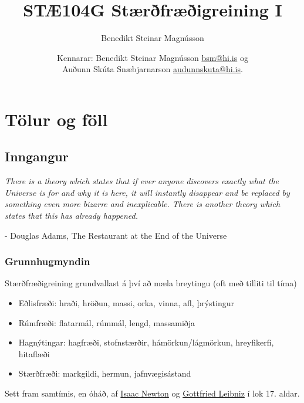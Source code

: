\documentclass[b5paper,10pt,icelandic]{sphinxmanual}
\title{STÆ104G Stærðfræðigreining I}
\date{Kennarar: Benedikt Steinar Magnússon \href{mailto:bsm@hi.is}{bsm@hi.is} og\\
	Auðunn Skúta Snæbjarnarson \href{mailto:audunnskuta@hi.is}{audunnskuta@hi.is}.}
\author{Benedikt Steinar Magnússon}
\begin{document}
\maketitle
\tableofcontents





\chapter{Tölur og föll}
\label{kafli01::doc}\label{kafli01:staerfraeigreining-i-stae104g-haskoli-islands-haust-2017}\label{kafli01:tolur-og-foll}

\section{Inngangur}
\label{kafli01:inngangur}
\emph{There is a theory which states that if ever anyone discovers exactly what the Universe is for and why it is here, it will instantly disappear and be replaced by something even more bizarre and inexplicable.
There is another theory which states that this has already happened.}

- Douglas Adams, The Restaurant at the End of the Universe


\subsection{Grunnhugmyndin}
\label{kafli01:grunnhugmyndin}
Stærðfræðigreining grundvallast á því að mæla breytingu (oft með tilliti
til tíma)
\begin{itemize}
\item {} 
Eðlisfræði: hraði, hröðun, massi, orka, vinna, afl, þrýstingur

\item {} 
Rúmfræði: flatarmál, rúmmál, lengd, massamiðja

\item {} 
Hagnýtingar: hagfræði, stofnstærðir, hámörkun/lágmörkun, hreyfikerfi, hitaflæði

\item {} 
Stærðfræði: markgildi, hermun, jafnvægisástand

\end{itemize}

Sett fram samtímis, en óháð, af
\href{http://www.visindavefur.is/svar.php?id=1635}{Isaac Newton} og
\href{http://www.visindavefur.is/svar.php?id=59920}{Gottfried Leibniz} í lok 17. aldar.
\end{document}
